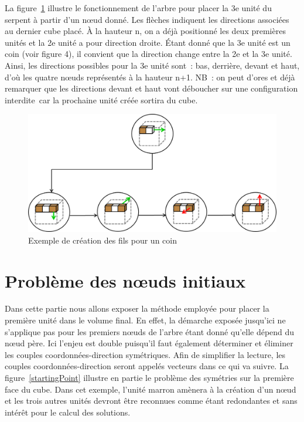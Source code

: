 La figure~\ref{buildCornerChildren} illustre le fonctionnement de l’arbre pour placer la 3e unité du serpent à partir d’un nœud donné. Les flèches indiquent les directions associées au dernier cube placé. À la hauteur n, on a déjà positionné les deux premières unités et la 2e unité a pour direction droite.  Étant donné que la 3e unité est un coin (voir figure 4), il convient que la direction change entre la 2e et la 3e unité. Ainsi, les directions possibles pour la 3e unité sont : bas, derrière, devant et haut, d’où les quatre nœuds représentés à la hauteur n+1. 
NB : on peut d’ores et déjà remarquer que les directions devant et haut vont déboucher sur une configuration interdite car la prochaine unité créée sortira du cube.

\begin{figure}[h]
 \centering
 \includegraphics[scale=0.5,keepaspectratio=true]{img/buildCornerChildren.png}
 \caption{Exemple de création des fils pour un coin}
 \label{buildCornerChildren}
\end{figure}

\clearpage
\section{Problème des nœuds initiaux}
Dans cette partie nous allons exposer la méthode employée pour 	placer la première unité dans le volume final. En effet, la démarche exposée jusqu’ici ne s’applique pas pour les premiers nœuds de l’arbre étant donné qu’elle dépend du nœud père. Ici l’enjeu est double puisqu’il faut également déterminer et éliminer les couples coordonnées-direction symétriques. Afin de simplifier la lecture, les couples coordonnées-direction seront appelés vecteurs dans ce qui va suivre. La figure~\ref{startingPoint} illustre en partie le problème des symétries sur la première face du cube. Dans cet exemple, l’unité marron amènera à la création d’un nœud et les trois autres unités devront être reconnues comme étant redondantes et sans intérêt pour le calcul des solutions. 

